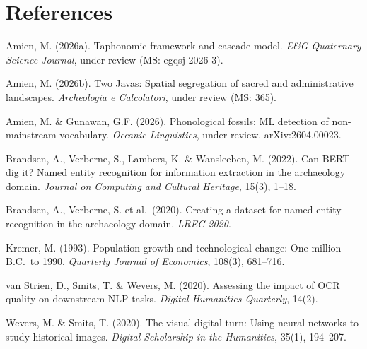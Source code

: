 \documentclass[11pt,a4paper]{article}
\begin{document}
\section*{References}

\begin{small}
\begin{description}[style=nextline,leftmargin=0em,font=\normalfont]
  \item Amien, M. (2026a). Taphonomic framework and cascade model. \emph{E\&G Quaternary Science Journal}, under review (MS: egqsj-2026-3).
  \item Amien, M. (2026b). Two Javas: Spatial segregation of sacred and administrative landscapes. \emph{Archeologia e Calcolatori}, under review (MS: 365).
  \item Amien, M. \& Gunawan, G.F. (2026). Phonological fossils: ML detection of non-mainstream vocabulary. \emph{Oceanic Linguistics}, under review. arXiv:2604.00023.
  \item Brandsen, A., Verberne, S., Lambers, K. \& Wansleeben, M. (2022). Can BERT dig it? Named entity recognition for information extraction in the archaeology domain. \emph{Journal on Computing and Cultural Heritage}, 15(3), 1--18.
  \item Brandsen, A., Verberne, S. et al.\ (2020). Creating a dataset for named entity recognition in the archaeology domain. \emph{LREC 2020}.
  \item Kremer, M. (1993). Population growth and technological change: One million B.C.\ to 1990. \emph{Quarterly Journal of Economics}, 108(3), 681--716.
  \item van Strien, D., Smits, T. \& Wevers, M. (2020). Assessing the impact of OCR quality on downstream NLP tasks. \emph{Digital Humanities Quarterly}, 14(2).
  \item Wevers, M. \& Smits, T. (2020). The visual digital turn: Using neural networks to study historical images. \emph{Digital Scholarship in the Humanities}, 35(1), 194--207.
\end{description}
\end{small}
\end{document}
